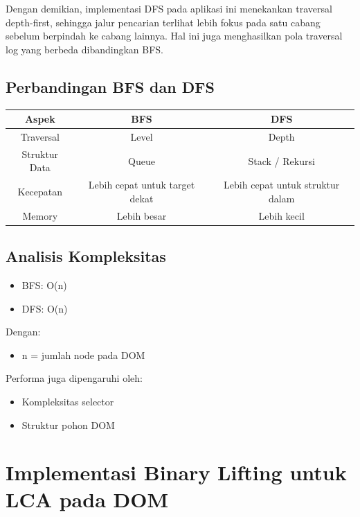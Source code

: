 Dengan demikian, implementasi DFS pada aplikasi ini menekankan traversal depth-first, sehingga jalur pencarian terlihat lebih fokus pada satu cabang sebelum berpindah ke cabang lainnya. Hal ini juga menghasilkan pola traversal log yang berbeda dibandingkan BFS.



\subsection{Perbandingan BFS dan DFS}

\begin{center}
\begin{tabular}{|c|c|c|}
\hline
Aspek & BFS & DFS \\
\hline
Traversal & Level & Depth \\
Struktur Data & Queue & Stack / Rekursi \\
Kecepatan & Lebih cepat untuk target dekat & Lebih cepat untuk struktur dalam \\
Memory & Lebih besar & Lebih kecil \\
\hline
\end{tabular}
\end{center}



\subsection{Analisis Kompleksitas}

\begin{itemize}
    \item BFS: O(n)
    \item DFS: O(n)
\end{itemize}

Dengan:
\begin{itemize}
    \item n = jumlah node pada DOM
\end{itemize}

Performa juga dipengaruhi oleh:
\begin{itemize}
    \item Kompleksitas selector
    \item Struktur pohon DOM
\end{itemize}



\section{Implementasi Binary Lifting untuk LCA pada DOM}

